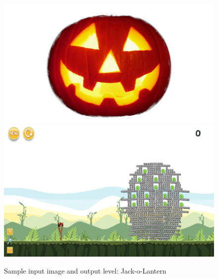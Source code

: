 \documentclass{dalthesis}
\begin{document}
\begin{figure}
	\caption{Sample input image and output level: Jack-o-Lantern}
  \includegraphics[width=\textwidth,height=\textheight,keepaspectratio]{levels/pictures/halloween/jack_o_lantern.jpg}
  \includegraphics[width=\textwidth,height=\textheight,keepaspectratio]{levels/screenshots/halloween/jack_o_lantern.png}
\end{figure}
\end{document}
